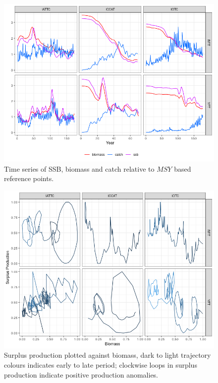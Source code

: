 \documentclass[12pt,doublespacing,a4paper]{ouparticle}
\begin{document}
\newpage
\begin{figure}[h]
\centering
\includegraphics[width=\textwidth]{pe-tsmsy-1.png}
\caption{Time series of SSB, biomass and catch relative to $MSY$ based reference points.}
\label{fig:ts}
\end{figure}


\newpage
\begin{figure}[h]
\centering
\includegraphics[width=\textwidth]{pe-sp2-1.png}
\caption{Surplus production plotted against biomass, dark to light trajectory colours indicates early to late period; clockwise loops in surplus production indicate positive production anomalies.}
\label{fig:sp}
\end{figure}
\end{document}
